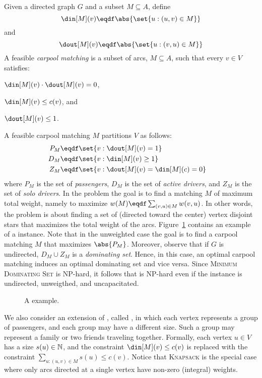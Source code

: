 Given a directed graph $G$ and a subset $M \subseteq A$, define
$$\din[M](v) \eqdf \abs{\set{u :(u,v) \in M}}$$ 
and
$$\dout[M](v) \eqdf \abs{\set{u :(v,u) \in M}}$$
%
A feasible \emph{carpool matching} is a subset of arcs, $M \subseteq
A$, such that every $v \in V$ satisfies:%
\begin{inparaenum}[(i)]
\item $\din[M](v) \cdot \dout[M](v) = 0$,
\item $\din[M](v) \leq c(v)$, and 
\item $\dout[M](v) \leq 1$.
\end{inparaenum}
A feasible carpool matching $M$ partitions $V$ as follows:
\begin{align*}
P_M & \eqdf \set{v : \dout[M](v) = 1} &
\\
D_M & \eqdf \set{v : \din[M](v) \geq 1} &
\\
Z_M & \eqdf \set{v : \dout[M](v) = \din[M](c) = 0}
\end{align*}
where $P_M$ is the set of \emph{passengers}, $D_M$ is the set of
\emph{active drivers}, and $Z_M$ is the set of \emph{solo drivers}.
%
In the \carpool problem the goal is to find a matching $M$ of maximum
total weight, namely to maximize $w(M) \eqdf \sum_{(v,u) \in M}
w(v,u)$.  In other words, the \carpool problem is about finding a set
of (directed toward the center) vertex disjoint stars that maximizes
the total weight of the arcs.  
%
Figure~\ref{fig:carpool-new} contains an example of a \carpool instance.
%
Note that in the unweighted case the goal is to find a carpool
matching $M$ that maximizes $\abs{P_M}$.
%
Moreover, observe that if $G$ is undirected, $D_M \cup Z_M$ is
a \emph{dominating set}.  Hence, in this case, an optimal carpool
matching induces an optimal dominating set and vice versa.
Since \textsc{Minimum Dominating Set} is NP-hard, it follows
that \carpool is NP-hard even if the instance is undirected,
unweigthed, and uncapacitated.

\begin{figure}
\centering
{}
\caption[]{
\label{fig:carpool-new}
A \carpool example.
}
\end{figure}  

%
We also consider an extension of \carpool, called \gcp, in which each
vertex represents a group of passengers, and each group may have a
different size.  Such a group may represent a family or two friends
traveling together.  Formally, each vertex $u \in V$ has a size
$s(u) \in \mathbb{N}$, and the constraint $\din[M](v) \leq c(v)$ is replaced
with the constraint $\sum_{u:(u,v) \in M} s(u) \leq c(v)$.
%
Notice that \textsc{Knapsack} is the special case where only arcs
directed at a single vertex have non-zero (integral) weights.

